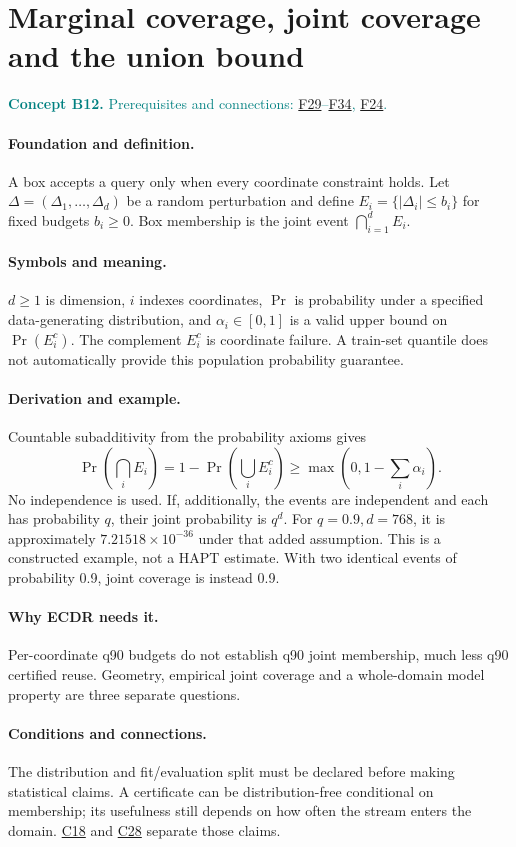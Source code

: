 \documentclass[11pt,a4paper]{article}
\newcommand{\conceptid}{Front matter}
\newcommand{\concept}[3]{\clearpage\renewcommand{\conceptid}{#1}%
\section{#2}\label{concept:#1}%
\textcolor{teal}{\textbf{Concept #1.} Prerequisites and connections: #3.}\par
\typeout{ECDR-CONCEPT-START #1 PAGE=\thepage}}
\begin{document}
\concept{B12}{Marginal coverage, joint coverage and the union bound}{\hyperref[concept:F29]{F29}--\hyperref[concept:F34]{F34}, \hyperref[concept:F24]{F24}}
\paragraph{Foundation and definition.}
A box accepts a query only when every coordinate constraint holds. Let
$\Delta=(\Delta_1,\ldots,\Delta_d)$ be a random perturbation and define
$E_i=\{|\Delta_i|\le b_i\}$ for fixed budgets $b_i\ge0$.
Box membership is the joint event $\bigcap_{i=1}^dE_i$.
\paragraph{Symbols and meaning.}
$d\ge1$ is dimension, $i$ indexes coordinates, $\Pr$ is probability under
a specified data-generating distribution, and $\alpha_i\in[0,1]$ is a
valid upper bound on $\Pr(E_i^c)$. The complement $E_i^c$ is coordinate
failure. A train-set quantile does not automatically provide this
population probability guarantee.
\paragraph{Derivation and example.}
Countable subadditivity from the probability axioms gives
\[
 \Pr\!\left(\bigcap_iE_i\right)
 =1-\Pr\!\left(\bigcup_iE_i^c\right)
 \ge\max\left(0,1-\sum_i\alpha_i\right).
\]
No independence is used. If, additionally, the events are independent and
each has probability $q$, their joint probability is $q^d$.
For $q=0.9,d=768$, it is approximately $7.21518\times10^{-36}$ under
that added assumption. This is a constructed example, not a HAPT estimate.
With two identical events of probability 0.9, joint coverage is instead 0.9.
\paragraph{Why ECDR needs it.}
Per-coordinate q90 budgets do not establish q90 joint membership, much
less q90 certified reuse. Geometry, empirical joint coverage and a
whole-domain model property are three separate questions.
\paragraph{Conditions and connections.}
The distribution and fit/evaluation split must be declared before making
statistical claims. A certificate can be distribution-free conditional on
membership; its usefulness still depends on how often the stream enters
the domain. \hyperref[concept:C18]{C18} and \hyperref[concept:C28]{C28} separate those claims.
\par\label{endconcept:B12}
\end{document}
